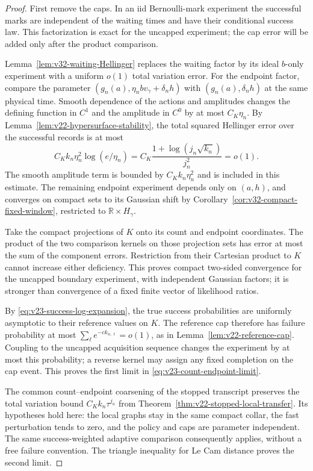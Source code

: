\begin{proof}
First remove the caps.  In an iid Bernoulli-mark experiment the successful
marks are independent of the waiting times and have their conditional
success law.  This factorization is exact for the uncapped experiment; the
cap error will be added only after the product comparison.

Lemma~\ref{lem:v32-waiting-Hellinger} replaces the waiting factor by its
ideal \(b\)-only experiment with a uniform \(o(1)\) total variation error.
For the endpoint factor, compare the parameter
\((g_n(a),\eta_nbv_\gamma+\delta_nh)\) with
\((g_n(a),\delta_nh)\) at the same physical time.  Smooth dependence of the
actions and amplitudes changes the defining function in \(C^1\) and the
amplitude in \(C^0\) by at most \(C_K\eta_n\).  By
Lemma~\ref{lem:v22-hypersurface-stability}, the total squared Hellinger
error over the successful records is at most
\begin{equation}\label{eq:v32-fast-mark-error}
 C_Kk_n\eta_n^2\log(e/\eta_n)
 =C_K\frac{1+\log(j_n\sqrt{k_n})}{j_n^2}=o(1).
\end{equation}
The smooth amplitude term is bounded by \(C_Kk_n\eta_n^2\) and is included
in this estimate.  The remaining endpoint experiment depends only on
\((a,h)\), and converges on compact sets to its Gaussian shift by
Corollary~\ref{cor:v32-compact-fixed-window}, restricted to
\(\mathbb R\times H_\gamma\).

Take the compact projections of \(K\) onto its count and endpoint
coordinates.  The product of the two comparison kernels on those projection
sets has error at most the sum of the component errors.  Restriction from
their Cartesian product to \(K\) cannot increase either deficiency.  This
proves compact two-sided convergence for the uncapped boundary experiment,
with independent Gaussian factors; it is stronger than convergence of a
fixed finite vector of likelihood ratios.

By \eqref{eq:v23-success-log-expansion}, the true success probabilities are
uniformly asymptotic to their reference values on \(K\).  The reference cap
therefore has failure probability at most
\(\sum_\ell e^{-c k_{n,\ell}}=o(1)\), as in
Lemma~\ref{lem:v22-reference-cap}.  Coupling to the uncapped acquisition
sequence changes the experiment by at most this probability; a reverse
kernel may assign any fixed completion on the cap event.  This proves the
first limit in \eqref{eq:v23-count-endpoint-limit}.

The common count--endpoint coarsening of the stopped transcript preserves
the total variation bound \(C_Kk_n\tau^{j_n}\) from
Theorem~\ref{thm:v22-stopped-local-transfer}.  Its hypotheses hold here: the
local graphs stay in the same compact collar, the fast perturbation tends
to zero, and the policy and caps are parameter independent.  The same
success-weighted adaptive comparison consequently applies, without a free
failure convention.  The triangle inequality for Le Cam distance proves the
second limit.
\end{proof}

